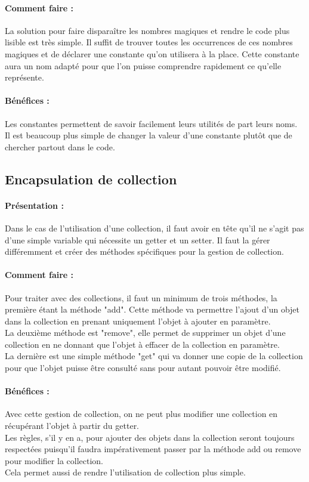 \documentclass[a4paper,twoside,12pt,openright]{report}
\begin{document}
\paragraph{Comment faire :}
La solution pour faire disparaître les nombres magiques et rendre le code plus lisible est très simple. Il suffit de trouver toutes les occurrences de ces nombres magiques et de déclarer une constante qu'on utilisera à la place. Cette constante aura un nom adapté pour que l'on puisse comprendre rapidement ce qu'elle représente.

\paragraph{Bénéfices :}
Les constantes permettent de savoir facilement leurs utilités de part leurs noms.\\
Il est beaucoup plus simple de changer la valeur d'une constante plutôt que de chercher partout dans le code.\\

\subsection{Encapsulation de collection}
\paragraph{Présentation :}
Dans le cas de l'utilisation d'une collection, il faut avoir en tête qu'il ne s'agit pas d'une simple variable qui nécessite un getter et un setter. Il faut la gérer différemment et créer des méthodes spécifiques pour la gestion de collection.

\paragraph{Comment faire :}
Pour traiter avec des collections, il faut un minimum de trois méthodes, la première étant la méthode "add". Cette méthode va permettre l'ajout d'un objet dans la collection en prenant uniquement l'objet à ajouter en paramètre.\\
La deuxième méthode est "remove", elle permet de supprimer un objet d'une collection en ne donnant que l'objet à effacer de la collection en paramètre.\\
La dernière est une simple méthode "get" qui va donner une copie de la collection pour que l'objet puisse être consulté sans pour autant pouvoir être modifié.

\paragraph{Bénéfices :}
Avec cette gestion de collection, on ne peut plus modifier une collection en récupérant l'objet à partir du getter.\\
Les règles, s'il y en a, pour ajouter des objets dans la collection seront toujours respectées puisqu'il faudra impérativement passer par la méthode add ou remove pour modifier la collection.\\
Cela permet aussi de rendre l'utilisation de collection plus simple.\\
\end{document}
